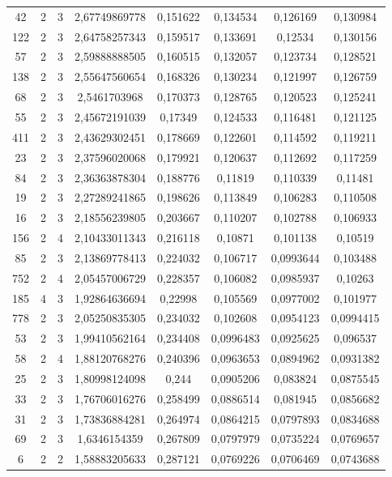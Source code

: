 \begin{longtable}{|c|c|c|c|c|c|c|c|}
42 & 2 & 3 & 2,67749869778 & 0,151622 & 0,134534 & 0,126169 & 0,130984 \\
122 & 2 & 3 & 2,64758257343 & 0,159517 & 0,133691 & 0,12534 & 0,130156 \\
57 & 2 & 3 & 2,59888888505 & 0,160515 & 0,132057 & 0,123734 & 0,128521 \\
138 & 2 & 3 & 2,55647560654 & 0,168326 & 0,130234 & 0,121997 & 0,126759 \\
68 & 2 & 3 & 2,5461703968 & 0,170373 & 0,128765 & 0,120523 & 0,125241 \\
55 & 2 & 3 & 2,45672191039 & 0,17349 & 0,124533 & 0,116481 & 0,121125 \\
411 & 2 & 3 & 2,43629302451 & 0,178669 & 0,122601 & 0,114592 & 0,119211 \\
23 & 2 & 3 & 2,37596020068 & 0,179921 & 0,120637 & 0,112692 & 0,117259 \\
84 & 2 & 3 & 2,36363878304 & 0,188776 & 0,11819 & 0,110339 & 0,11481 \\
19 & 2 & 3 & 2,27289241865 & 0,198626 & 0,113849 & 0,106283 & 0,110508 \\
16 & 2 & 3 & 2,18556239805 & 0,203667 & 0,110207 & 0,102788 & 0,106933 \\
156 & 2 & 4 & 2,10433011343 & 0,216118 & 0,10871 & 0,101138 & 0,10519 \\
85 & 2 & 3 & 2,13869778413 & 0,224032 & 0,106717 & 0,0993644 & 0,103488 \\
752 & 2 & 4 & 2,05457006729 & 0,228357 & 0,106082 & 0,0985937 & 0,10263 \\
185 & 4 & 3 & 1,92864636694 & 0,22998 & 0,105569 & 0,0977002 & 0,101977 \\
778 & 2 & 3 & 2,05250835305 & 0,234032 & 0,102608 & 0,0954123 & 0,0994415 \\
53 & 2 & 3 & 1,99410562164 & 0,234408 & 0,0996483 & 0,0925625 & 0,096537 \\
58 & 2 & 4 & 1,88120768276 & 0,240396 & 0,0963653 & 0,0894962 & 0,0931382 \\
25 & 2 & 3 & 1,80998124098 & 0,244 & 0,0905206 & 0,083824 & 0,0875545 \\
33 & 2 & 3 & 1,76706016276 & 0,258499 & 0,0886514 & 0,081945 & 0,0856682 \\
31 & 2 & 3 & 1,73836884281 & 0,264974 & 0,0864215 & 0,0797893 & 0,0834688 \\
69 & 2 & 3 & 1,6346154359 & 0,267809 & 0,0797979 & 0,0735224 & 0,0769657 \\
6 & 2 & 2 & 1,58883205633 & 0,287121 & 0,0769226 & 0,0706469 & 0,0743688 \\

\end{longtable}
